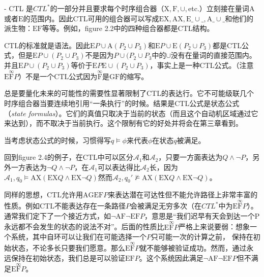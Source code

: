 \documentclass{book}
\begin{document}
    - CTL 是$CTL^*$的一部分并且要求每个时序组合器（$\mathrm{X},\mathrm{F},\cup,$etc.）立刻接在量词$\mathrm{A}$或者$\mathrm{E}$的范围内。因此CTL可用的组合器可以写成$\mathrm{E}\mathrm{X},\mathrm{A}\mathrm{X},\mathrm{E}\_\cup \_,\mathrm{A}\_\cup \_$和他们的派生物：$\mathrm{E}\mathrm{F}$等等。例如，figure 2.2中的四种组合器都是CTL结构。
    
    CTL的标准就是语法。因此$\mathrm{E}P\cup\mathrm{A}(P_2\cup P_3)$和$\mathrm{E}P\cup\mathrm{E}(P_2\cup P_3)$都是CTL公式，但是$\mathrm{E}P\cup(P_2\cup P_3)$不是因为$P\cup(P_2\cup P_3$中的$\cup$没有在量词的直接范围内。并且$\mathrm{E}P\cup(P_2\cup P_3)$等价于$\mathrm{E}P\mathrm{E}\cup(P_2\cup P_3)$，事实上是一种CTL公式。（注意$\mathrm{E}\overset{\infty}{\mathrm{F}}P$）不是一个CTL公式因为$\overset{\infty}{\mathrm{F}}$是$\mathrm{G}\mathrm{F}$的缩写。
    
    总是要量化未来的可能性的需要性显著限制了CTL的表达行。它不可能级联几个时序组合器当要连续地引用“一条执行”的时候。结果是CTL公式是状态公式（{\itshape state formulas}）。它们的真值只取决于当前的状态（而且这个自动机区域通过它来达到），而不取决于当前执行。这个限制有它的好处并将会在第三章看到。
    
    当考虑状态公式的时候，习惯得写$q\models \phi$来代表$\phi$在状态$q$被满足。
    
    回到figure 2.4的例子，在CTL中可以区分$\mathcal{A}_1$和$\mathcal{A}_2$，只要一方面表达为$Q \wedge \neg P$，另外一方表达为$\neg Q \wedge \neg P$，在$\mathcal{A}_1$可以表达得比$\mathcal{A}_2$长，因为$\mathcal{A}_1,q_0 \models \mathrm{A}\mathrm{X}(\mathrm{E}\mathrm{X}Q\wedge\mathrm{E}\mathrm{X}\neg Q)$然而$\mathcal{A}_2,q_0' \nvDash \mathrm{A}\mathrm{X}(\mathrm{E}\mathrm{X}Q\wedge\mathrm{E}\mathrm{X}\neg Q)$。
    
    同样的思想，CTL允许用$\mathrm{A}\mathrm{G}\mathrm{E}\mathrm{F}P$来表达潜在可达性但不能允许路径上非常丰富的性质。例如CTL不能表达存在一条路径$P$会被满足无穷多次（在$CTL^*$中为$\mathrm{E}\overset{\infty}{\mathrm{F}}P$）。通常我们定下了一个接近方式，如$\neg\mathrm{A}\mathrm{F}\neg\mathrm{E}\mathrm{F}P$，意思是“我们迟早有天会到达一个P永远都不会发生的状态的说法不对”。后面的性质比$\mathrm{E}\overset{\infty}{\mathrm{F}}P$严格上来说要弱：想象一个系统，其中自环可以让我们在可能选择一个$P$只可能一次的计算之前， 保持在初始状态，不论多长只要我们愿意。那么$\mathrm{E}\overset{\infty}{\mathrm{F}}P$就不能够被验证成功。然而，通过永远保持在初始状态，我们总是可以验证$\mathrm{E}\mathrm{F}P$。这个系统因此满足$\neg\mathrm{A}\mathrm{F}\neg\mathrm{E}\mathrm{F}P$但不满足$\mathrm{E}\overset{\infty}{\mathrm{F}}P$。
    
\end{document}
